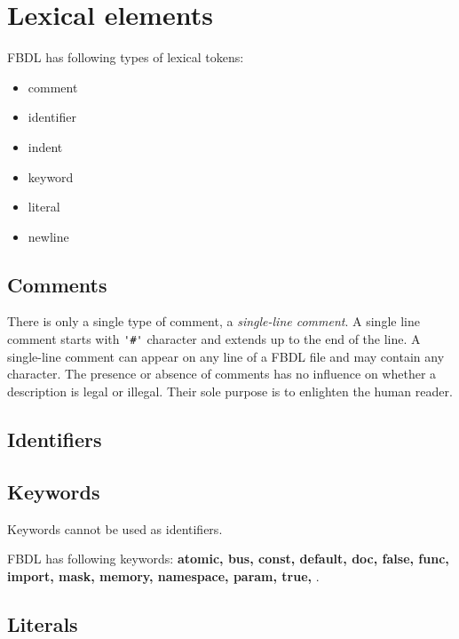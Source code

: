 \chapter{Lexical elements}

FBDL has following types of lexical tokens:
\begin{itemize}
	\item comment
	\item identifier
	\item indent
	\item keyword
	\item literal
	\item newline
\end{itemize}

\section{Comments}

There is only a single type of comment, a \textit{single-line comment}.
A single line comment starts with \lstinline{'#'} character and extends up to the end of the line.
A single-line comment can appear on any line of a FBDL file and may contain any character.
The presence or absence of comments has no influence on whether a description is legal or illegal.
Their sole purpose is to enlighten the human reader.

\section{Identifiers}

\section{Keywords}

Keywords cannot be used as identifiers.

FBDL has following keywords: \textbf{
atomic,
bus,
const,
default,
doc,
false,
func,
import,
mask,
memory,
namespace,
param,
true,
}.

\section{Literals}
